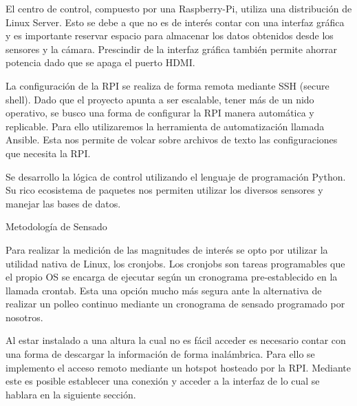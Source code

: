 El centro de control, compuesto por una Raspberry-Pi, utiliza una distribución de Linux Server. Esto se debe a que no es de interés contar con una interfaz gráfica y es importante reservar espacio para almacenar los datos obtenidos desde los sensores y la cámara. 
Prescindir de la interfaz gráfica también permite ahorrar potencia dado que se apaga el puerto HDMI.


La configuración de la RPI se realiza de forma remota mediante SSH (secure shell).
Dado que el proyecto apunta a ser escalable, tener más de un nido operativo, se busco una forma de configurar la RPI manera automática y replicable. Para ello utilizaremos la herramienta  de automatización llamada Ansible. Esta nos permite de volcar sobre archivos de texto las configuraciones que necesita la RPI.

Se desarrollo la lógica de control utilizando el lenguaje de programación Python. Su rico ecosistema de paquetes nos permiten utilizar los diversos sensores y manejar las bases de datos.

Metodología de Sensado

Para realizar la medición de las magnitudes de interés se opto por utilizar la utilidad nativa de Linux, los cronjobs. Los cronjobs son tareas programables que el propio OS se encarga de ejecutar según un cronograma pre-establecido en la llamada crontab. Esta una opción mucho más segura ante la alternativa de realizar un polleo continuo mediante un cronograma de sensado programado por nosotros.

Al estar instalado a una altura la cual no es fácil acceder es necesario contar con una forma de descargar la información de forma inalámbrica. Para ello se implemento el acceso remoto mediante un hotspot hosteado por la RPI. Mediante este es posible establecer una conexión y acceder a la interfaz de lo cual se hablara en la siguiente sección. 











